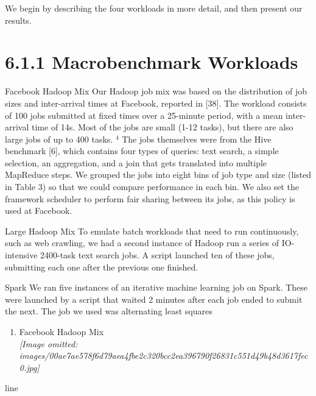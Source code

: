 \documentclass[
]{article}
\providecommand{\tightlist}{%
  \setlength{\itemsep}{0pt}\setlength{\parskip}{0pt}}
\begin{document}
We begin by describing the four workloads in more detail, and then
present our results.

\section{6.1.1 Macrobenchmark Workloads}\label{macrobenchmark-workloads}

Facebook Hadoop Mix Our Hadoop job mix was based on the distribution of
job sizes and inter-arrival times at Facebook, reported in {[}38{]}. The
workload consists of 100 jobs submitted at fixed times over a 25-minute
period, with a mean inter-arrival time of 14s. Most of the jobs are
small (1-12 tasks), but there are also large jobs of up to 400 tasks.
\(^{4}\) The jobs themselves were from the Hive benchmark {[}6{]}, which
contains four types of queries: text search, a simple selection, an
aggregation, and a join that gets translated into multiple MapReduce
steps. We grouped the jobs into eight bins of job type and size (listed
in Table 3) so that we could compare performance in each bin. We also
set the framework scheduler to perform fair sharing between its jobs, as
this policy is used at Facebook.

Large Hadoop Mix To emulate batch workloads that need to run
continuously, such as web crawling, we had a second instance of Hadoop
run a series of IO-intensive 2400-task text search jobs. A script
launched ten of these jobs, submitting each one after the previous one
finished.

Spark We ran five instances of an iterative machine learning job on
Spark. These were launched by a script that waited 2 minutes after each
job ended to submit the next. The job we used was alternating least
squares

\begin{enumerate}
\def\labelenumi{(\alph{enumi})}
\tightlist
\item
  Facebook Hadoop Mix\\
  \textit{[Image omitted: images/00ae7ae578f6d79aea4fbe2c320bcc2ea396790f26831c551d49b48d3617fec0.jpg]}
\end{enumerate}

line
\end{document}
